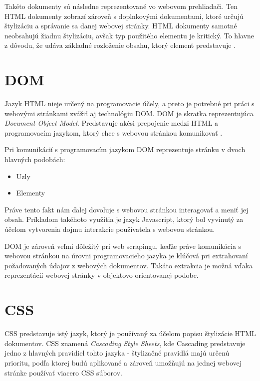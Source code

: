 Takéto dokumenty sú následne reprezentované vo webovom prehliadači. Ten HTML dokumenty zobrazí zároveň s doplnkovými dokumentami, ktoré určujú štylizáciu a správanie sa danej webovej stránky. HTML dokumenty samotné neobsahujú žiadnu štylizáciu, avšak typ použitého elementu je kritický. To hlavne z dôvodu, že udáva základné rozloženie obsahu, ktorý element predstavuje \cite{WhatisHTML}.

\section{DOM}
\label{DOM}

Jazyk HTML nieje určený na programovacie účely, a preto je potrebné pri práci s webovými stránkami zvážiť aj technológiu DOM. DOM je skratka reprezentujúca \textit{Document Object Model}. Predstavuje akési prepojenie medzi HTML a programovacím jazykom, ktorý chce s webovou stránkou komunikovať \cite{DOM}. 

Pri komunikácií s programovacím jazykom DOM reprezentuje stránku v dvoch hlavných podobách:

\begin{itemize}
    \item {Uzly}
    \item {Elementy}
\end{itemize}

Práve tento fakt nám ďalej dovoľuje s webovou stránkou interagovať a meniť jej obsah. Príkladom takéhoto využitia je jazyk Javascript, ktorý bol vyvinutý za účelom vytvorenia dojmu interakcie používateľa s webovou stránkou. 

DOM je zároveň veľmi dôležitý pri web scrapingu, keďže práve komunikácia s webovou stránkou na úrovni programovacieho jazyka je kľúčová pri extrahovaní požadovaných údajov z webových dokumentov. Takáto extrakcia je možná vďaka reprezentácií webovej stránky v objektovo orientovanej podobe.

\section{CSS}

CSS predstavuje istý jazyk, ktorý je používaný za účelom popisu štylizácie HTML dokumentov. CSS znamená \textit{Cascading Style Sheets}, kde Cascading predstavuje jedno z hlavných pravidiel tohto jazyka - štylizačné pravidlá majú určenú prioritu, podľa ktorej budú aplikované a zároveň umožňujú na jednej webovej stránke používať viacero CSS súborov. 

